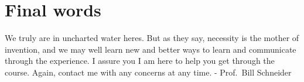 \documentclass[11pt]{article}
\begin{document}
\section{Final words}
\label{sec:org4b17fda}
We truly are in uncharted water heres.  But as they say, necessity is the mother of invention, and we may well learn new and better ways to learn and communicate through the experience. I assure you I am here to help you get through the course. Again, contact me with any concerns at any time. - Prof.~Bill Schneider
\end{document}
